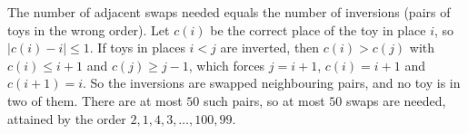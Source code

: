 The number of adjacent swaps needed equals the number of inversions (pairs of toys in the wrong order). Let $c(i)$ be the correct place of the toy in place $i$, so $|c(i)-i|\le1$. If toys in places $i<j$ are inverted, then $c(i)>c(j)$ with $c(i)\le i+1$ and $c(j)\ge j-1$, which forces $j=i+1$, $c(i)=i+1$ and $c(i+1)=i$. So the inversions are swapped neighbouring pairs, and no toy is in two of them. There are at most $50$ such pairs, so at most $\boxed{50}$ swaps are needed, attained by the order $2,1,4,3,\dots,100,99$.

